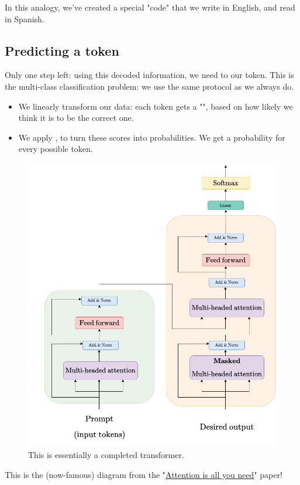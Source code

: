         In this analogy, we've created a special "code" that we write in English, and read in Spanish.

    \phantom{}

    \subsection{Predicting a token}

        Only one step left: using this decoded information, we need to  our token. This is the multi-class classification problem: we use the same protocol as we always do.

        \begin{itemize}
            \item We linearly transform our data: each token gets a "", based on how likely we think it is to be the correct one.

            \item We apply , to turn these scores into probabilities. We get a probability for every possible token.
        \end{itemize}

        \begin{figure}[H]
            \centering
            \includegraphics[width=0.65\linewidth]{images/transformers_images/transformer.png}
            \caption*{This is essentially a completed transformer.}
        \end{figure}

        This is the (now-famous) diagram from the "\href{https://arxiv.org/pdf/1706.03762.pdf}{Attention is all you need}" paper! 

